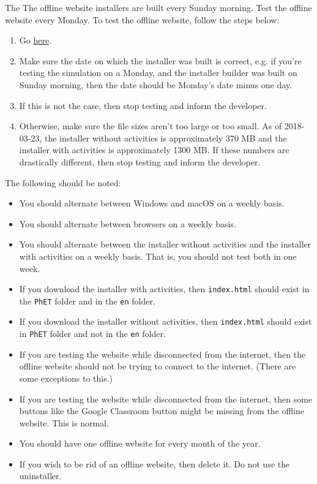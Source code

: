 \documentclass[titlepage]{article}
\begin{document}
The The offline website installers are built every Sunday morning. Test the offline website every Monday. To test the offline website, follow the steps below:

		\begin{enumerate}
			\item Go \href{https://phet.colorado.edu/en/offline-access}{here}.
			\item Make sure the date on which the installer was built is correct, e.g. if you're testing the simulation on a Monday, and the installer builder was built on Sunday morning, then the date should be Monday's date minus one day.
			\item If this is not the case, then stop testing and inform the developer.
			\item Otherwise, make sure the file sizes aren't too large or too small. As of 2018-03-23, the installer without activities is approximately 370 MB and the installer with activities is approximately 1300 MB. If these numbers are drastically different, then stop testing and inform the developer.
		\end{enumerate}
		
The following should be noted:

		\begin{itemize}
			\item You should alternate between Windows and macOS on a weekly basis.
			\item You should alternate between browsers on a weekly basis.
			\item You should alternate between the installer without activities and the installer with activities on a weekly basis. That is, you should not test both in one week.
			\item If you download the installer with activities, then \verb|index.html| should exist in the \verb|PhET| folder and in the \verb|en| folder.
			\item If you download the installer without activities, then \verb|index.html| should exist in \verb|PhET| folder and not in the \verb|en| folder.
			\item If you are testing the website while disconnected from the internet, then the offline website should not be trying to connect to the internet. (There are some exceptions to this.)
			\item If you are testing the website while disconnected from the internet, then some buttons like the Google Classroom button might be missing from the offline website. This is normal.
			\item You should have one offline website for every month of the year.
			\item If you wish to be rid of an offline website, then delete it. Do not use the uninstaller.
		\end{itemize}
		
\end{document}
